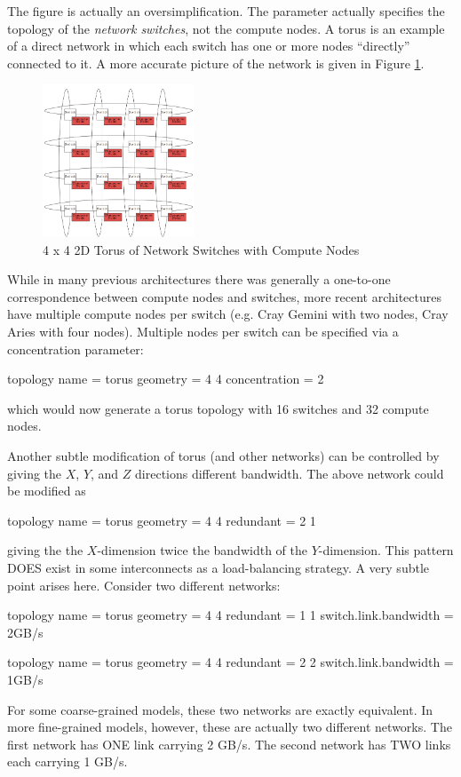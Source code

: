 The figure is actually an oversimplification.  
The  parameter actually specifies the topology of the \emph{network switches}, not the compute nodes. 
A torus is an example of a direct network in which each switch has one or more nodes ``directly'' connected to it.  
A more accurate picture of the network is given in Figure \ref{fig:torus:withnodes}.
\begin{figure}[h]
\centering
\includegraphics[width=0.4\textwidth]{figures/tikz/torus/withnodes.png}
\caption{4 x 4 2D Torus of Network Switches with Compute Nodes}
\label{fig:torus:withnodes}
\end{figure}
While in many previous architectures there was generally a one-to-one correspondence between compute nodes and switches, more recent architectures have multiple compute nodes per switch (e.g. Cray Gemini with two nodes, Cray Aries with four nodes).  
Multiple nodes per switch can be specified via a concentration parameter:

\begin{ViFile}
topology {
 name = torus
 geometry = 4 4
 concentration = 2
}
\end{ViFile}
which would now generate a torus topology with 16 switches and 32 compute nodes.

Another subtle modification of torus (and other networks) can be controlled by giving the $X$, $Y$, and $Z$ directions different bandwidth.  
The above network could be modified as

\begin{ViFile}
topology {
 name = torus
 geometry = 4 4
 redundant = 2 1
}
\end{ViFile}
giving the the $X$-dimension twice the bandwidth of the $Y$-dimension.  
This pattern DOES exist in some interconnects as a load-balancing strategy.  
A very subtle point arises here. Consider two different networks:

\begin{ViFile}
topology {
 name = torus
 geometry = 4 4
 redundant = 1 1
}
switch.link.bandwidth = 2GB/s
\end{ViFile}
\begin{ViFile}
topology {
 name = torus
 geometry = 4 4
 redundant = 2 2
}
switch.link.bandwidth = 1GB/s
\end{ViFile}
For some coarse-grained models, these two networks are exactly equivalent.  
In more fine-grained models, however, these are actually two different networks.  
The first network has ONE link carrying 2 GB/s. The second network has TWO links each carrying 1 GB/s.

